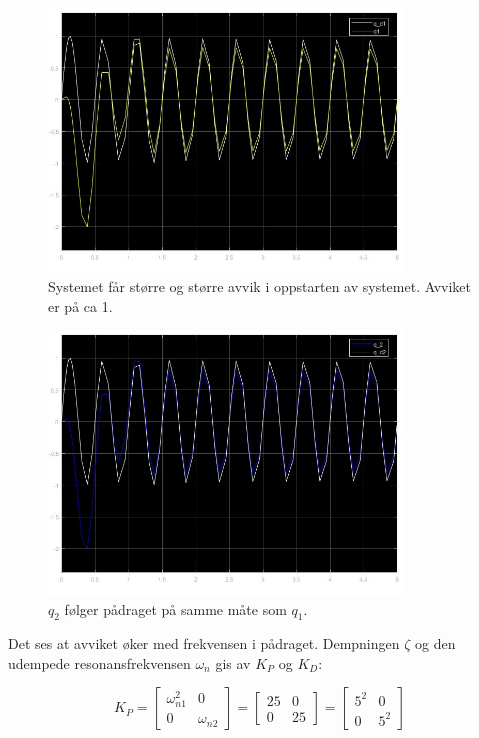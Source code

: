\documentclass[norsk]{article}
\begin{document}
\begin{itemize}
\begin{figure}[H]
\includegraphics[height=7cm]{illustrations/oppg3f_illu5}
\caption{Systemet får større og større avvik i oppstarten av systemet. Avviket er på ca 1.}
\end{figure}
\begin{figure}[H]
\includegraphics[height=7cm]{illustrations/oppg3f_illu6}
\caption{\(q_2\) følger pådraget på samme måte som \(q_1\).}
\end{figure}
\end{itemize}
Det ses at avviket øker med frekvensen i pådraget. Dempningen \(\zeta\) og den udempede resonansfrekvensen \(\omega_n\) gis av \(K_P\) og \(K_D\):

\[K_P = \begin{bmatrix}
\omega_{n1}^2 & 0 \\ 0 & \omega_{n2}
\end{bmatrix} 
= 
\begin{bmatrix}
25 & 0 \\ 0 & 25 
\end{bmatrix}
=
\begin{bmatrix}
5^2 & 0 \\ 0 & 5^2
\end{bmatrix}\]
\end{document}
